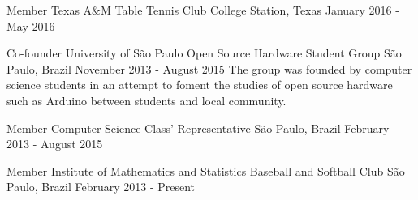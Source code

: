 \documentclass[11pt, a4paper]{awesome-cv-res}
\begin{document}
\begin{cventries}

\cventry
{Member}
{Texas A\&M Table Tennis Club}
{College Station, Texas}
{January 2016 - May 2016}
{}

\cventry
{Co-founder}
{University of São Paulo Open Source Hardware Student Group}
{São Paulo, Brazil}
{November 2013 - August 2015}
{The group was founded by computer science students in an attempt to foment the studies of open source hardware such as Arduino between students and local community.}
\newline
\newline

\cventry
{Member}
{Computer Science Class' Representative}
{São Paulo, Brazil}
{February 2013 - August 2015}
{}

\cventry
{Member}
{Institute of Mathematics and Statistics Baseball and Softball Club}
{São Paulo, Brazil}
{February 2013 - Present}
{}

\end{cventries}
\end{document}
